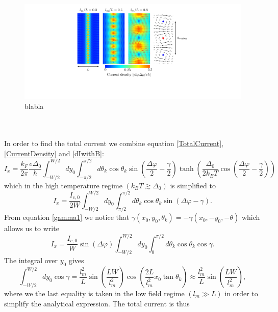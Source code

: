 \begin{figure}[hhh]
\centering
\includegraphics[width=15cm,clip=true,trim=10cm 4cm 10cm 0cm]{fig/Dist1}
\caption{blabla}
\label{fig:Constant}
\end{figure}
\\
\\
In order to find the total current we combine equation \eqref{TotalCurrent}, \eqref{CurrentDensity} and \eqref{dIwithB}:
\begin{equation}
I_x = \frac{k_F}{2\pi}\frac{e\Delta_0}{\hbar}\int_{-W/2}^{W/2}dy_0\int_{-\pi/2}^{\pi/2}d\theta_k\cos \theta_k \sin\left(\frac{\Delta \varphi}{2}-\frac{\gamma}{2}\right)\tanh\left(\frac{\Delta_0}{2k_BT}\cos\left(\frac{\Delta \varphi}{2}-\frac{\gamma}{2}\right)\right)
\end{equation}
which in the high temperature regime $(k_BT \gtrsim \Delta_0)$ is simplified to
\begin{equation}
I_x = \frac{I_{c,0}}{2W}\int_{-W/2}^{W/2}dy_0\int_{\pi/2}^{\pi/2} d\theta_k \cos \theta_k \sin (\Delta \varphi - \gamma ).
\label{TotalCurrentHighT}
\end{equation}
From equation \eqref{gamma1} we notice that $\gamma(x_0,y_0,\theta_k) = -\gamma(x_0,-y_0,-\theta)$ which allows us to write
\begin{equation}
I_x = \frac{I_{c,0}}{W}\sin(\Delta \varphi) \int_{-W/2}^{W/2}dy_0\int_0^{\pi/2} d\theta_k\cos \theta_k \cos\gamma.
\end{equation}
The integral over $y_0$ gives
\begin{equation}
\int_{-W/2}^{W/2}dy_0\cos\gamma = \frac{l_m^2}{L}\sin\left(\frac{LW}{l_m^2}\right)\cos\left(\frac{2L}{l_m^2}x_0\tan\theta_k\right) \approx \frac{l_m^2}{L}\sin\left(\frac{LW}{l_m^2}\right),
\end{equation}
where we the last equality is taken in the low field regime $(l_m \gg L)$ in order to simplify the analytical expression. The total current is thus
